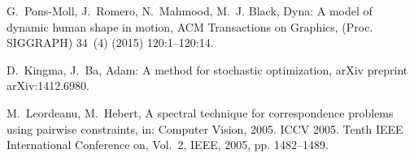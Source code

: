 \documentclass[5p,twocolumn,10pt,times]{elsarticle}
\begin{document}
\begin{thebibliography}{10}
G.~Pons-Moll, J.~Romero, N.~Mahmood, M.~J. Black, Dyna: A model of dynamic
  human shape in motion, ACM Transactions on Graphics, (Proc. SIGGRAPH) 34~(4)
  (2015) 120:1--120:14.

D.~Kingma, J.~Ba, Adam: A method for stochastic optimization, arXiv preprint
  arXiv:1412.6980.

M.~Leordeanu, M.~Hebert, A spectral technique for correspondence problems using
  pairwise constraints, in: Computer Vision, 2005. ICCV 2005. Tenth IEEE
  International Conference on, Vol.~2, IEEE, 2005, pp. 1482--1489.

\end{thebibliography}
\end{document}
